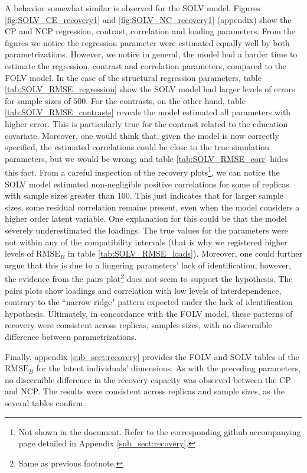 A behavior somewhat similar is observed for the SOLV model. Figures \ref{fig:SOLV_CE_recovery1} and \ref{fig:SOLV_NC_recovery1} (appendix) show the CP and NCP regression, contrast, correlation and loading parameters. From the figures we notice the regression parameter were estimated equally well by both parametrizations. However, we notice in general, the model had a harder time to estimate the regression, contrast and correlation parameters, compared to the FOLV model. In the case of the structural regression parameters, table \ref{tab:SOLV_RMSE_regression} show the SOLV model had larger levels of errors for sample sizes of $500$. For the contrasts, on the other hand, table \ref{tab:SOLV_RMSE_contrasts} reveals the model estimated all parameters with higher error. This is particularly true for the contrast related to the education covariate. Moreover, one would think that, given the model is now correctly specified, the estimated correlations could be close to the true simulation parameters, but we would be wrong; and table \ref{tab:SOLV_RMSE_corr} hides this fact. From a careful inspection of the recovery plots\footnote{Not shown in the document. Refer to the corresponding github accompanying page detailed in Appendix \ref{sub_sect:recovery}.}, we can notice the SOLV model estimated non-negligible positive correlations for some of replicas with sample sizes greater than $100$. This just indicates that for larger sample sizes, some residual correlation remains present, even when the model considers a higher order latent variable. One explanation for this could be that the model severely underestimated the loadings. The true values for the parameters were not within any of the compatibility intervals (that is why we registered higher levels of $\text{RMSE}_{B}$ in table \ref{tab:SOLV_RMSE_loads}). Moreover, one could further argue that this is due to a lingering parameters' lack of identification, however, the evidence from the pairs plot\footnote{Same as previous footnote.} does not seem to support the hypothesis. The pairs plots show loadings and correlation with low levels of interdependence, contrary to the ``narrow ridge" pattern expected under the lack of identification hypothesis. Ultimately, in concordance with the FOLV model, these patterns of recovery were consistent across replicas, samples sizes, with no discernible difference between parametrizations.

Finally, appendix \ref{sub_sect:recovery} provides the FOLV and SOLV tables of the $\text{RMSE}_{B}$ for the latent individuals' dimensions. As with the preceding parameters, no discernible difference in the recovery capacity was observed between the CP and NCP. The results were consistent across replicas and sample sizes, as the several tables confirm. 

